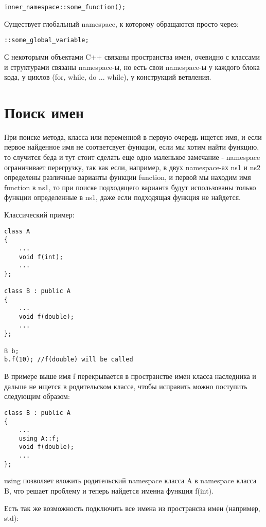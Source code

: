\begin{lstlisting}
inner_namespace::some_function();
\end{lstlisting}

Существует глобальный namespace, к которому обращаются просто через:

\begin{lstlisting}
::some_global_variable;
\end{lstlisting}

С некоторыми объектами C++ связаны пространства имен, очевидно с классами и структурами связаны namespace-ы, но есть свои namespace-ы
у каждого блока кода, у циклов (for, while, do ... while), у конструкций ветвления.

\section{Поиск имен}

При поиске метода, класса или переменной в первую очередь ищется имя, и если первое найденное имя не соответсвует функции,
если мы хотим найти функцию, то случится беда и тут стоит сделать еще одно маленькое замечание - namespace ограничивает
перегрузку, так как если, например, в двух namespace-ах ns1 и ns2 определены различные варианты функции function, и первой
мы находим имя function в ns1, то при поиске подходящего варианта будут использованы только функции определенные в ns1, даже
если подходящая функция не найдется.

Классический пример:

\begin{lstlisting}
class A
{
	...
	void f(int);
	...
};

class B : public A
{
	...
	void f(double);
	...
};

B b;
b.f(10); //f(double) will be called
\end{lstlisting}

В примере выше имя f перекрывается в пространстве имен класса наследника и дальше не ищется в родительском классе, чтобы исправить
можно поступить следующим образом:

\begin{lstlisting}
class B : public A
{
	...
	using A::f;
	void f(double);
	...
};
\end{lstlisting}

using позволяет вложить родительский namespace класса A в namespace класса B, что решает проблему и теперь найдется именна функция f(int).

Есть так же возможность подключить все имена из пространсва имен (например, std):

